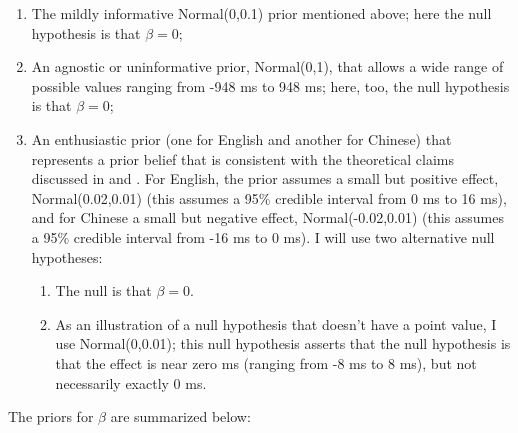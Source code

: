 \documentclass{ar-1col}\usepackage[]{graphicx}\usepackage[]{color}
\begin{document}
\begin{enumerate}
\item The mildly informative Normal(0,0.1) prior mentioned above; here the null hypothesis is that $\beta=0$;
\item An agnostic or uninformative prior, Normal(0,1), that allows a wide range of possible values ranging from -948 ms to 948 ms; here, too, the null hypothesis is that $\beta=0$;
\item An enthusiastic prior (one for English and another for Chinese) that represents a prior belief that is consistent with the theoretical claims discussed in \citet{grodner} and \citet{gibsonwu}. For English, the prior assumes a small but positive effect, Normal(0.02,0.01) (this assumes a 95\% credible interval from 0 ms to 16 ms), and for Chinese a small but negative effect, Normal(-0.02,0.01) (this assumes a 95\% credible interval from -16 ms to 0 ms). I will use two alternative null hypotheses:
\begin{enumerate}
\item  The null is that $\beta = 0$.
\item As an illustration of a null hypothesis that doesn't have a point value, I use Normal(0,0.01); this null hypothesis asserts that the null hypothesis is that the effect is near zero ms (ranging from -8 ms to 8 ms), but not necessarily exactly 0 ms.
\end{enumerate}
\end{enumerate}

The priors for $\beta$ are summarized below:
\end{document}
